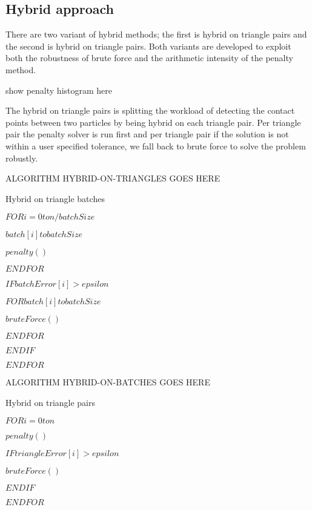 \subsection{Hybrid approach}

There are two variant of hybrid methods; the first is hybrid on triangle pairs and the second is hybrid on triangle pairs. Both variants are developed to exploit both the robustness of brute force and the arithmetic intensity of the penalty method.

show penalty histogram here



The hybrid on triangle pairs is splitting the workload of detecting the contact points between two particles by being hybrid on each triangle pair. Per triangle pair the penalty solver is run first and per triangle pair if the solution is not within a user specified tolerance, we fall back to brute force to solve the problem robustly.  

ALGORITHM HYBRID-ON-TRIANGLES GOES HERE

\begin{algorithm}
 \caption{Hybrid on triangle batches} \label{algorithm:bf}
 \begin{algorithmic}[1]
	
	\State $FOR i = 0 to n/batchSize$

		\State $batch[i] to batchSize$		
					
			\State $penalty()$

		\State $ENDFOR$

		\State $IF batchError[i] > epsilon$

			\State $FOR batch[i] to batchSize$
	
				\State $bruteForce()$

			\State $ENDFOR$
	
		\State $ENDIF$
	
	\State $ENDFOR$
	
 \end{algorithmic}
\end{algorithm} 


ALGORITHM HYBRID-ON-BATCHES GOES HERE

\begin{algorithm}
 \caption{Hybrid on triangle pairs} \label{algorithm:bf}
 \begin{algorithmic}[1]
	
	\State $FOR i = 0 to n$
	
		\State $penalty()$

		\State $IF triangleError[i] > epsilon$

				\State $bruteForce()$
	
		\State $ENDIF$
	
	\State $ENDFOR$
	
 \end{algorithmic}
\end{algorithm} 


